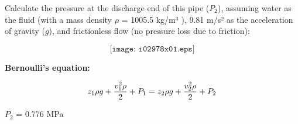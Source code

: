 

Calculate the pressure at the discharge end of this pipe ($P_2$), assuming water as the fluid (with a mass density $\rho$ = 1005.5 kg/m³ ),  9.81 m/s² as the acceleration of gravity ($g$), and frictionless flow (no pressure loss due to friction):

$$\texttt{[image: i02978x01.eps]}$$


\vskip 10pt

\noindent
{\bf Bernoulli's equation:}

$$z_1 \rho g + {v_1^2 \rho \over 2} + P_1 = z_2 \rho g + {v_2^2 \rho \over 2} + P_2$$







$P_2$ = 0.776 MPa










